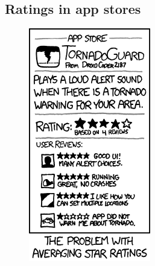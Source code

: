 \subsection{Ratings in app stores}


\begin{figure}[htbp!]
\centering
\begin{minipage}{.4\textwidth}
  \centering
  \includegraphics[width=\textwidth]{images/xkcd/tornadoguard.png}

\end{minipage}
\end{figure}

